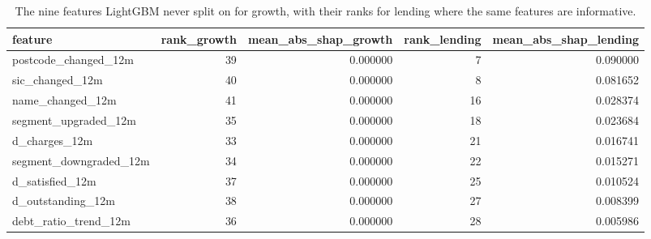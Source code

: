 \begin{table}
\caption{The nine features LightGBM never split on for growth, with their ranks for lending where the same features are informative.}
\label{tab:growth_zero_shap_receipt}
\begin{tabular}{lrrrr}
\toprule
feature & rank_growth & mean_abs_shap_growth & rank_lending & mean_abs_shap_lending \\
\midrule
postcode_changed_12m & 39 & 0.000000 & 7 & 0.090000 \\
sic_changed_12m & 40 & 0.000000 & 8 & 0.081652 \\
name_changed_12m & 41 & 0.000000 & 16 & 0.028374 \\
segment_upgraded_12m & 35 & 0.000000 & 18 & 0.023684 \\
d_charges_12m & 33 & 0.000000 & 21 & 0.016741 \\
segment_downgraded_12m & 34 & 0.000000 & 22 & 0.015271 \\
d_satisfied_12m & 37 & 0.000000 & 25 & 0.010524 \\
d_outstanding_12m & 38 & 0.000000 & 27 & 0.008399 \\
debt_ratio_trend_12m & 36 & 0.000000 & 28 & 0.005986 \\
\bottomrule
\end{tabular}
\end{table}

